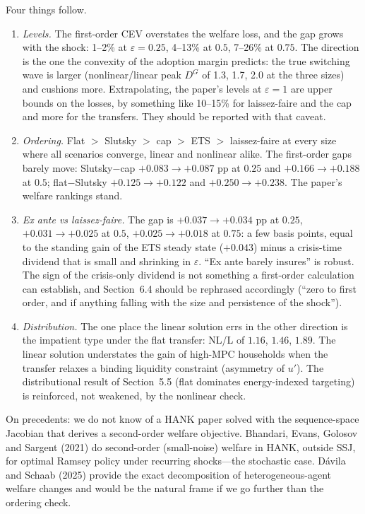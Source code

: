 \documentclass[11pt]{article}
\begin{document}
\noindent Four things follow.
\begin{enumerate}\itemsep2pt
\item \emph{Levels.} The first-order CEV overstates the welfare loss, and the gap grows with the shock: 1--2\% at $\varepsilon=0.25$, 4--13\% at $0.5$, 7--26\% at $0.75$. The direction is the one the convexity of the adoption margin predicts: the true switching wave is larger (nonlinear/linear peak $D^G$ of 1.3, 1.7, 2.0 at the three sizes) and cushions more. Extrapolating, the paper's levels at $\varepsilon=1$ are upper bounds on the losses, by something like 10--15\% for laissez-faire and the cap and more for the transfers. They should be reported with that caveat.
\item \emph{Ordering.} Flat $>$ Slutsky $>$ cap $>$ ETS $>$ laissez-faire at every size where all scenarios converge, linear and nonlinear alike. The first-order gaps barely move: Slutsky$-$cap $+0.083\to+0.087$ pp at $0.25$ and $+0.166\to+0.188$ at $0.5$; flat$-$Slutsky $+0.125\to+0.122$ and $+0.250\to+0.238$. The paper's welfare rankings stand.
\item \emph{Ex ante vs laissez-faire.} The gap is $+0.037\to+0.034$ pp at $0.25$, $+0.031\to+0.025$ at $0.5$, $+0.025\to+0.018$ at $0.75$: a few basis points, equal to the standing gain of the ETS steady state ($+0.043$) minus a crisis-time dividend that is small and shrinking in $\varepsilon$. ``Ex ante barely insures'' is robust. The sign of the crisis-only dividend is not something a first-order calculation can establish, and Section~6.4 should be rephrased accordingly (``zero to first order, and if anything falling with the size and persistence of the shock'').
\item \emph{Distribution.} The one place the linear solution errs in the other direction is the impatient type under the flat transfer: NL/L of $1.16$, $1.46$, $1.89$. The linear solution understates the gain of high-MPC households when the transfer relaxes a binding liquidity constraint (asymmetry of $u'$). The distributional result of Section~5.5 (flat dominates energy-indexed targeting) is reinforced, not weakened, by the nonlinear check.
\end{enumerate}

On precedents: we do not know of a HANK paper solved with the sequence-space Jacobian that derives a second-order welfare objective. Bhandari, Evans, Golosov and Sargent (2021) do second-order (small-noise) welfare in HANK, outside SSJ, for optimal Ramsey policy under recurring shocks---the stochastic case. Dávila and Schaab (2025) provide the exact decomposition of heterogeneous-agent welfare changes and would be the natural frame if we go further than the ordering check.
\end{document}
